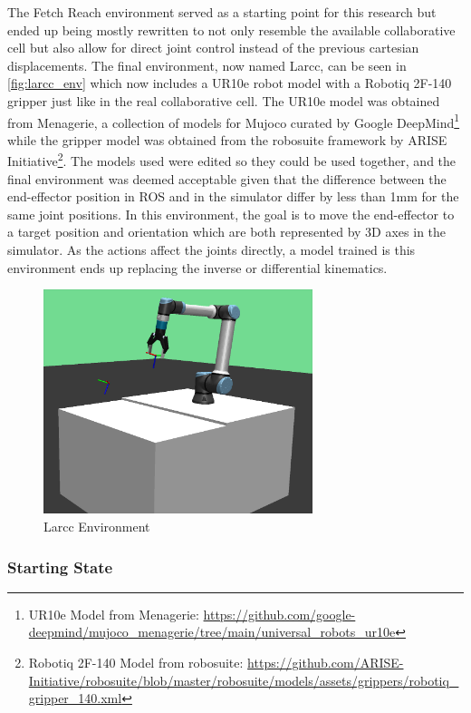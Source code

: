 The Fetch Reach environment served as a starting point for this research but ended up being mostly rewritten to not only resemble the available collaborative cell but also allow for direct joint control instead of the previous cartesian displacements. The final environment, now named Larcc, can be seen in \autoref{fig:larcc_env} which now includes a UR10e robot model with a Robotiq 2F-140 gripper just like in the real collaborative cell. The UR10e model was obtained from Menagerie, a collection of models for Mujoco curated by Google DeepMind\footnote{UR10e Model from Menagerie: \url{https://github.com/google-deepmind/mujoco_menagerie/tree/main/universal_robots_ur10e}} while the gripper model was obtained from the robosuite framework by 
ARISE Initiative\footnote{Robotiq 2F-140 Model from robosuite: \url{https://github.com/ARISE-Initiative/robosuite/blob/master/robosuite/models/assets/grippers/robotiq_gripper_140.xml}}. The models used were edited so they could be used together, and the final environment was deemed acceptable given that the difference between the end-effector position in ROS and in the simulator differ by less than 1mm for the same joint positions. In this environment, the goal is to move the end-effector to a target position and orientation which are both represented by 3D axes in the simulator. As the actions affect the joints directly, a model trained is this environment ends up replacing the inverse or differential kinematics.

\begin{figure}[H]%
    \centerline{\includegraphics[width=0.7\textwidth]{figs/larcc_env.png}}
    \caption[Larcc Environment]{Larcc Environment}
    \label{fig:larcc_env}
\end{figure}

\subsubsection{Starting State}

